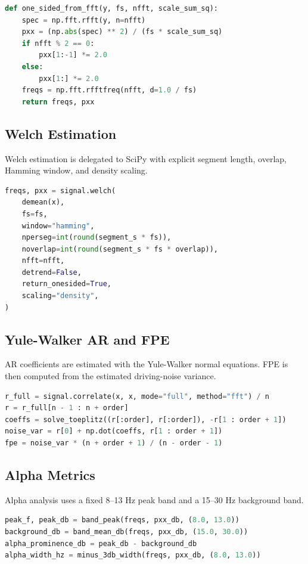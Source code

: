 \documentclass[11pt]{article}
\begin{document}
\begin{lstlisting}[language=Python,caption={One-sided PSD scaling used by direct FFT and periodogram estimates.}]
def one_sided_from_fft(y, fs, nfft, scale_sum_sq):
    spec = np.fft.rfft(y, n=nfft)
    pxx = (np.abs(spec) ** 2) / (fs * scale_sum_sq)
    if nfft % 2 == 0:
        pxx[1:-1] *= 2.0
    else:
        pxx[1:] *= 2.0
    freqs = np.fft.rfftfreq(nfft, d=1.0 / fs)
    return freqs, pxx
\end{lstlisting}

\subsection{Welch Estimation}
Welch estimation is delegated to SciPy with explicit segment length, overlap, Hamming window, and density scaling.

\begin{lstlisting}[language=Python,caption={Welch PSD configuration.}]
freqs, pxx = signal.welch(
    demean(x),
    fs=fs,
    window="hamming",
    nperseg=int(round(segment_s * fs)),
    noverlap=int(round(segment_s * fs * overlap)),
    nfft=nfft,
    detrend=False,
    return_onesided=True,
    scaling="density",
)
\end{lstlisting}

\subsection{Yule-Walker AR and FPE}
AR coefficients are estimated with the Yule-Walker normal equations. FPE is then computed from the estimated driving-noise variance.

\begin{lstlisting}[language=Python,caption={Yule-Walker AR estimation and FPE.}]
r_full = signal.correlate(x, x, mode="full", method="fft") / n
r = r_full[n - 1 : n + order]
coeffs = solve_toeplitz((r[:order], r[:order]), -r[1 : order + 1])
noise_var = r[0] + np.dot(coeffs, r[1 : order + 1])
fpe = noise_var * (n + order + 1) / (n - order - 1)
\end{lstlisting}

\subsection{Alpha Metrics}
Alpha analysis uses a fixed 8--13 Hz peak band and a 15--30 Hz background band.

\begin{lstlisting}[language=Python,caption={Alpha peak, prominence, and width metrics.}]
peak_f, peak_db = band_peak(freqs, pxx_db, (8.0, 13.0))
background_db = band_mean_db(freqs, pxx_db, (15.0, 30.0))
alpha_prominence_db = peak_db - background_db
alpha_width_hz = minus_3db_width(freqs, pxx_db, (8.0, 13.0))
\end{lstlisting}
\end{document}

